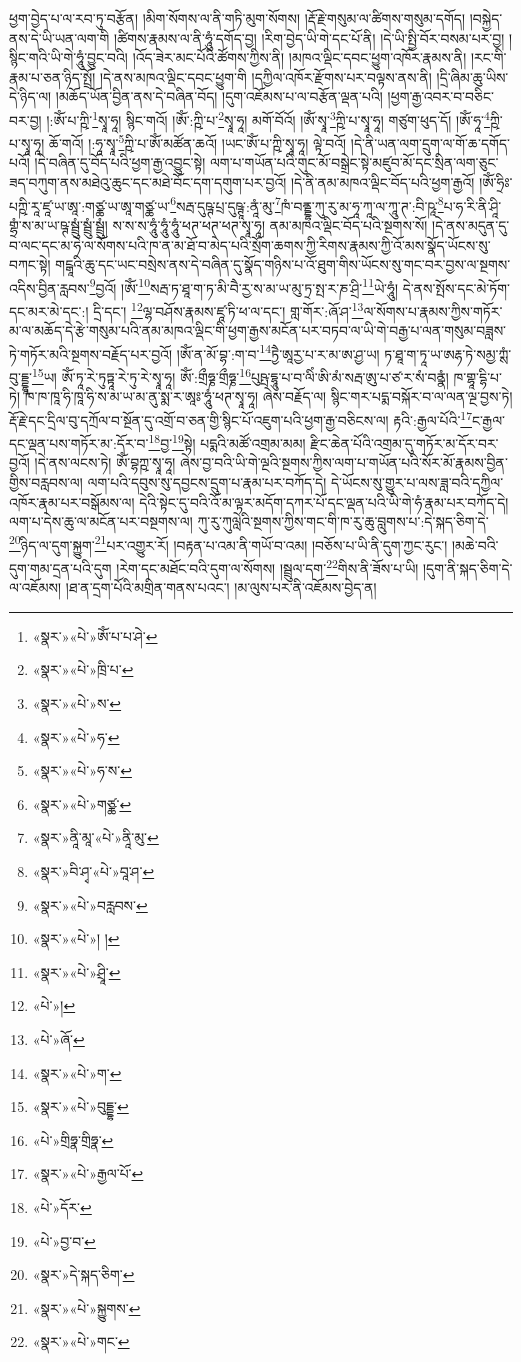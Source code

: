 ཕྱག་བྱེད་པ་ལ་རབ་ཏུ་བརྩོན། །མིག་སོགས་ལ་ནི་གཏི་མུག་སོགས། །རྡོ་རྗེ་གསུམ་ལ་ཚིགས་གསུམ་དགོད། །བསྐྱེད་ནས་དེ་ཡི་ཡན་ལག་གི །ཚིགས་རྣམས་ལ་ནི་ཧཱུཾ་དགོད་བྱ། །རིག་བྱེད་ཡི་གེ་དང་པོ་ནི། །དེ་ཡི་སྤྱི་བོར་བསམ་པར་བྱ། །སྙིང་གའི་ཡི་གེ་ཧཱུཾ་བྱུང་བའི། །འོད་ཟེར་མང་པོའི་ཚོགས་ཀྱིས་ནི། །མཁའ་ལྡིང་དབང་ཕྱུག་འཁོར་རྣམས་ནི། །རང་གི་རྣམ་པ་ཅན་ཉིད་སྤྲོ། །དེ་ནས་མཁའ་ལྡིང་དབང་ཕྱུག་གི །དཀྱིལ་འཁོར་རྫོགས་པར་བལྟས་ནས་ནི། །དྲི་ཞིམ་ཆུ་ཡིས་དེ་ཉིད་ལ། །མཆོད་ཡོན་བྱིན་ནས་དེ་བཞིན་བོད། །དུག་འཇོམས་པ་ལ་བརྩོན་ལྡན་པའི། །ཕྱག་རྒྱ་འབར་བ་བཅིང་བར་བྱ། །:ཨོཾ་པ་ཀྵི་\footnote{«སྣར་»«པེ་»ཨོཾ་པ་པ་ཤེ་}སྭཱ་ཧཱ། སྙིང་གའོ། །ཨོཾ་:ཀྵི་པ་\footnote{«སྣར་»«པེ་»ཁྲི་པ་}སྭཱ་ཧཱ། མགོ་བོའོ། །ཨོཾ་སྭཱ་\footnote{«སྣར་»«པེ་»ས་}ཀྵི་པ་སྭཱ་ཧཱ། གཙུག་ཕུད་དོ། །ཨོཾ་ཧཱ་\footnote{«སྣར་»«པེ་»ཧ་}ཀྵི་པ་སྭཱ་ཧཱ། ཆོ་གའོ། །:ཧཱ་སྭཱ་\footnote{«སྣར་»«པེ་»ཧ་ས་}ཀྵི་པ་ཨོཾ་མཚོན་ཆའོ། །ཡང་ཨོཾ་པ་ཀྵི་སྭཱ་ཧཱ། ལྟེ་བའོ། །དེ་ནི་ཡན་ལག་དྲུག་ལ་གོ་ཆ་དགོད་པའོ། །དེ་བཞིན་དུ་བོད་པའི་ཕྱག་རྒྱ་འབྱུང་སྟེ། ལག་པ་གཡོན་པའི་གུང་མོ་བསྒྲེང་སྟེ་མཛུབ་མོ་དང་སྲིན་ལག་ཅུང་ཟད་བཀུག་ནས་མཐེའུ་ཆུང་དང་མཐེ་བོང་དག་དགུག་པར་བྱའོ། །དེ་ནི་ནམ་མཁའ་ལྡིང་བོད་པའི་ཕྱག་རྒྱའོ། །ཨོཾ་ཧྲིཿ་པཀྵི་རཱ་ཛཱ་ཡ་ཨཱ་:གཙྪ་ཡ་ཨཱ་གཙྪ་ཡ་\footnote{«སྣར་»«པེ་»གཙྪ་}སརྦ་དུཥྚ་པྲ་དུཥྚཱ་:ནཱཾ་མུ་\footnote{«སྣར་»ནཱི་མཱ་«པེ་»ནཱི་མུ་}ཁཾ་བནྡྷ་ཀུ་རུ་མ་ཧཱ་ཀཱ་ལ་ཀཱུ་ཊ་:བི་ཥཱ་\footnote{«སྣར་»བི་ཤྭ་«པེ་»བཱ་ཤ་}པ་ཧ་རི་ནི་ཤཱི་གྷྲཾ་ས་མ་ཡ་ཥྚ་སྦྲུཾ་སྦྲུཾ་སྦྲུཾ། ས་ས་ས་ཧཱུཾ་ཧཱུཾ་ཧཱུཾ་ཕཊ་ཕཊ་ཕཊ་སྭཱ་ཧཱ། ནམ་མཁའ་ལྡིང་བོད་པའི་སྔགས་སོ། །དེ་ནས་མདུན་དུ་བ་ལང་དང་མ་ཧེ་ལ་སོགས་པའི་ཁ་ན་མ་ཐོ་བ་མེད་པའི་སྲོག་ཆགས་ཀྱི་རིགས་རྣམས་ཀྱི་འོ་མས་སྣོད་ཡོངས་སུ་བཀང་སྟེ། གངྒཱའི་ཆུ་དང་ཡང་བསྲེས་ནས་དེ་བཞིན་དུ་སྣོད་གཉིས་པ་འོ་ཐུག་གིས་ཡོངས་སུ་གང་བར་བྱས་ལ་སྔགས་འདིས་བྱིན་རླབས་\footnote{«སྣར་»«པེ་»བརླབས་}བྱའོ། །ཨོཾ་\footnote{«སྣར་»«པེ་»། །}སརྦ་ཏ་ཐཱ་ག་ཏ་མི་བཻ་རྱ་ས་མ་ཡ་མུ་ཏྲ་སྤ་ར་ཎ་ཤྲི་\footnote{«སྣར་»«པེ་»ཤྲཱི་}ཡེ་ཧཱུཾ། དེ་ནས་སྤོས་དང་མེ་ཏོག་དང་མར་མེ་དང་:། དྲི་དང་། \footnote{«པེ་»།  }ལྷ་བཤོས་རྣམས་ཛཱ་ཏི་ཕ་ལ་དང་། གླ་གོར་:ཞོ་ཤ་\footnote{«པེ་»ཞོ་}ལ་སོགས་པ་རྣམས་ཀྱིས་གཏོར་མ་ལ་མཆོད་དེ་རྩེ་གསུམ་པའི་ནམ་མཁའ་ལྡིང་གི་ཕྱག་རྒྱས་མངོན་པར་བཏབ་ལ་ཡི་གེ་བརྒྱ་པ་ལན་གསུམ་བཟླས་ཏེ་གཏོར་མའི་སྔགས་བརྗོད་པར་བྱའོ། །ཨོཾ་ན་མོ་བྷ་:ག་བ་\footnote{«སྣར་»«པེ་»ག་}ཏྱཻ་ཨཱརྱ་པ་ར་མ་ཨ་ཤྱ་ཡ། ཏ་ཐཱ་ག་ཏཱ་ཡ་ཨརྷ་ཏེ་སམྱ་ཀྶཾ་བུ་དྡྷཱ་\footnote{«སྣར་»«པེ་»བུདྡྷ་}ཡ། ཨོཾ་ཏཱ་རེ་ཏུཏྟཱ་རེ་ཏུ་རེ་སྭཱ་ཧཱ། ཨོཾ་:གྲྀཧྞ་གྲྀཧྞ་\footnote{«པེ་»གྲིཧྣ་གྲིཧྣ་}པུཥྤ་དྷཱུ་པ་བ་ལིཾ་ཨི་མཾ་སརྦ་ཨུ་པ་ཙ་ར་སཾ་བནྣཾ། ཁ་གྷཱ་དྷི་པ་ཏེ། ཁ་ཁ་ཁཱ་ཧི་ཁཱ་ཧི་ས་མ་ཡ་མ་ནུ་སྨ་ར་ཨཱཿ་ཧཱུཾ་ཕཊ་སྭཱ་ཧཱ། ཞེས་བརྗོད་ལ། སྙིང་གར་པདྨ་བསྐོར་བ་ལ་ལན་ལྔ་བྱས་ཏེ། རྡོ་རྗེ་དང་དྲིལ་བུ་དཀྲོལ་བ་སྔོན་དུ་འགྲོ་བ་ཅན་གྱི་སྙིང་པོ་འཇུག་པའི་ཕྱག་རྒྱ་བཅིངས་ལ། རྟའི་:རྒྱལ་པོའི་\footnote{«སྣར་»«པེ་»རྒྱལ་པོ་}ང་རྒྱལ་དང་ལྡན་པས་གཏོར་མ་:དོར་བ་\footnote{«པེ་»དོར་}བྱ་\footnote{«པེ་»བྱ་བ་}སྟེ། པདྨའི་མཚོ་འགྲམ་མམ། རྫིང་ཆེན་པོའི་འགྲམ་དུ་གཏོར་མ་དོར་བར་བྱའོ། །དེ་ནས་ལངས་ཏེ། ཨོཾ་བྷཀྵ་སྭཱ་ཧཱ། ཞེས་བྱ་བའི་ཡི་གེ་ལྔའི་སྔགས་ཀྱིས་ལག་པ་གཡོན་པའི་སོར་མོ་རྣམས་བྱིན་གྱིས་བརླབས་ལ། ལག་པའི་དབུས་སུ་དབྱངས་དྲུག་པ་རྣམ་པར་བཀོད་དེ། དེ་ཡོངས་སུ་གྱུར་པ་ལས་ཟླ་བའི་དཀྱིལ་འཁོར་རྣམ་པར་བསྒོམས་ལ། དེའི་སྟེང་དུ་བའི་འོ་མ་ལྟར་མདོག་དཀར་པོ་དང་ལྡན་པའི་ཡི་གེ་ཧཾ་རྣམ་པར་བཀོད་དེ། ལག་པ་དེས་ཆུ་ལ་མངོན་པར་བསྔགས་ལ། ཀུ་རུ་ཀུལླེའི་སྔགས་ཀྱིས་གང་གི་ཁ་རུ་ཆུ་བླུགས་པ་:དེ་སྐད་ཅིག་དེ་\footnote{«སྣར་»དེ་སྐད་ཅིག་}ཉིད་ལ་དུག་སྐྱུག་\footnote{«སྣར་»«པེ་»སྐྱུགས་}པར་འགྱུར་རོ། །བརྟན་པ་འམ་ནི་གཡོ་བ་འམ། །བཅོས་པ་ཡི་ནི་དུག་ཀྱང་རུང་། །མཆེ་བའི་དུག་གམ་དྲན་པའི་དུག །རེག་དང་མཐོང་བའི་དུག་ལ་སོགས། །སྦྲུལ་དག་\footnote{«སྣར་»«པེ་»གང་}གིས་ནི་ཟོས་པ་ཡི། །དུག་ནི་སྐད་ཅིག་དེ་ལ་འཇོམས། །ཐ་ན་དྲག་པོའི་མགྲིན་གནས་པའང་། །མ་ལུས་པར་ནི་འཇོམས་བྱེད་ན། 
